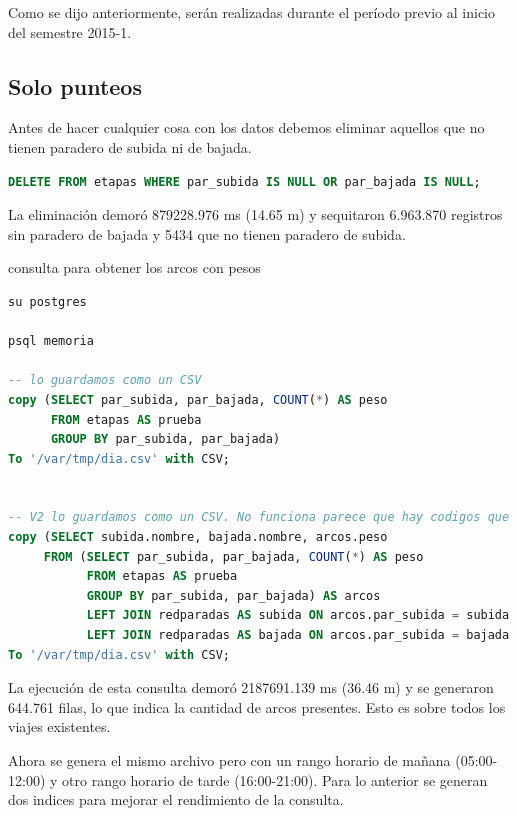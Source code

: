 \documentclass[12pt]{article}
\begin{document}
    Como se dijo anteriormente, serán realizadas durante el período previo al inicio del semestre 2015-1.
    
	\subsection{Solo punteos}    
    
    Antes de hacer cualquier cosa con los datos debemos eliminar aquellos que no tienen paradero de subida ni de bajada.
    
\begin{lstlisting}[breaklines=true, 
				   language=SQL, 
				   caption=Generación de arcos,
				   label=fig:generacion_arcos]	
DELETE FROM etapas WHERE par_subida IS NULL OR par_bajada IS NULL;
\end{lstlisting}
    La eliminación demoró 879228.976 ms (14.65 m) y sequitaron 6.963.870 registros sin paradero de bajada y 5434 que no tienen paradero de subida.    
    
consulta para obtener los arcos con pesos 
	
\begin{lstlisting}[breaklines=true, 
				   language=SQL, 
				   caption=Generación de arcos,
				   label=fig:generacion_arcos]		
su postgres

psql memoria
	
-- lo guardamos como un CSV
copy (SELECT par_subida, par_bajada, COUNT(*) AS peso 
	  FROM etapas AS prueba 
	  GROUP BY par_subida, par_bajada) 
To '/var/tmp/dia.csv' with CSV;


-- V2 lo guardamos como un CSV. No funciona parece que hay codigos que no estan en la tabla de paraderos. Esta consulta no se ocupo (con acento en la o)
copy (SELECT subida.nombre, bajada.nombre, arcos.peso
	 FROM (SELECT par_subida, par_bajada, COUNT(*) AS peso 
	  	   FROM etapas AS prueba 
	  	   GROUP BY par_subida, par_bajada) AS arcos
	  	   LEFT JOIN redparadas AS subida ON arcos.par_subida = subida.codigo 
	  	   LEFT JOIN redparadas AS bajada ON arcos.par_subida = bajada.codigo) 
To '/var/tmp/dia.csv' with CSV;
\end{lstlisting}

	La ejecución de esta consulta demoró 2187691.139 ms (36.46 m) y se generaron 644.761 filas, lo que indica la cantidad de arcos presentes. Esto es sobre todos los viajes existentes.
	
	Ahora se genera el mismo archivo pero con un rango horario de mañana (05:00-12:00) y otro rango horario de tarde  (16:00-21:00). Para lo anterior se generan dos indices para mejorar el rendimiento de la consulta.
   
\end{document}
